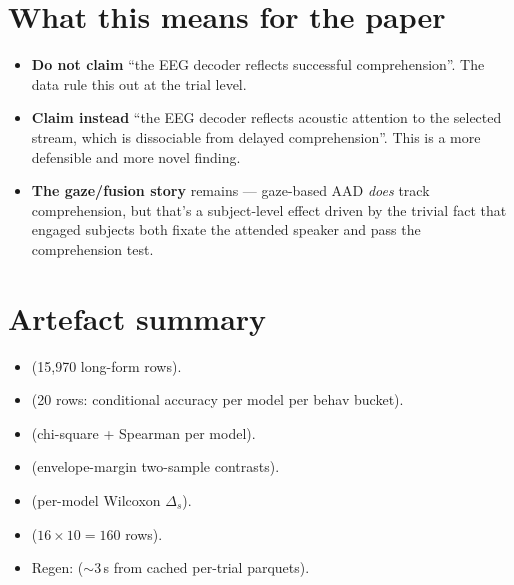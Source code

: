\section{What this means for the paper}

\begin{itemize}
  \item \textbf{Do not claim} ``the EEG decoder reflects successful
        comprehension''. The data rule this out at the trial level.
  \item \textbf{Claim instead} ``the EEG decoder reflects acoustic
        attention to the selected stream, which is dissociable from
        delayed comprehension''. This is a more defensible and more
        novel finding.
  \item \textbf{The gaze/fusion story} remains --- gaze-based AAD
        \emph{does} track comprehension, but that's a subject-level
        effect driven by the trivial fact that engaged subjects both
        fixate the attended speaker and pass the comprehension test.
\end{itemize}

\section{Artefact summary}

\begin{itemize}
  \item {}  (15{,}970 long-form rows).
  \item {} (20 rows:
        conditional accuracy per model per behav bucket).
  \item {} (chi-square
        + Spearman per model).
  \item {}
        (envelope-margin two-sample contrasts).
  \item {}
        (per-model Wilcoxon $\Delta_s$).
  \item {}
        ($16 \times 10 = 160$ rows).
  \item Regen: 
        ($\sim 3$\,s from cached per-trial parquets).
\end{itemize}

